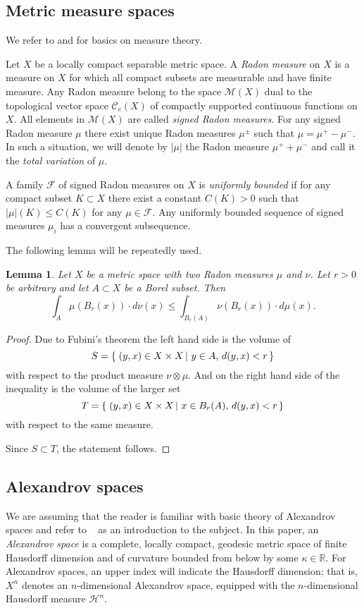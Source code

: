 \documentclass[12pt,leqno,intlimits]{amsart}
\numberwithin{equation}{section}
\newtheorem{lem}[thm]{Lemma}
\theoremstyle{definition}
\theoremstyle{remark}
\newcommand{\R}{\mathbb{R}}
\newcommand*{\set}[2]{\left\{\,\left.{#1}\vphantom{#2}\,\right|\,{#2}\,\right\}}
\begin{document}
\subsection{Metric measure spaces} We refer to \cite{Federer} and \cite{Evans} for basics on measure theory.

Let $X$ be a locally compact separable metric space.
A \emph{Radon measure} on $X$ is a measure on $X$ for which all compact subsets are measurable and have finite measure.
Any Radon measure belong to the space $\mathcal M(X)$ dual to the topological vector space $\mathcal C_c (X)$ of compactly supported continuous functions on $X$.
All elements in $\mathcal M(X)$ are called \emph{signed Radon measures}.
For any signed Radon measure $\mu$ there exist unique Radon measures $\mu^{\pm}$ such that $\mu =\mu ^+- \mu ^-$.
In such a situation, we will denote by $|\mu |$ the Radon measure $\mu ^+ +\mu ^-$ and call it the \emph{total variation} of $\mu$.


A family $\mathcal F$ of signed Radon measures on $X$ is \emph{uniformly bounded} if for any compact subset $K\subset X$ there exist a constant $C(K)>0$ such that $|\mu| (K) \leq C(K)$ for any $\mu \in \mathcal F$.
Any uniformly bounded sequence of signed measures $\mu _i$ has a convergent subsequence.

The following lemma will be repeatedly used.

\begin{lem} \label{lem:exchange}
Let $X$ be a metric space with two Radon measures $\mu $ and $\nu$. Let $r>0$ be arbitrary and let $A\subset X$ be a Borel subset. Then
$$\int _A \mu (B_r(x)) \cdot d\nu (x) \leq \int _{B_r (A)} \nu (B_r (x)) \cdot d\mu (x).$$
\end{lem}

\begin{proof} Due to Fubini's theorem
the left hand side is the volume of 
$$S=\set{(y,x) \in X\times X}{y \in A,\, d(y,x) <r}$$
with respect to the product measure $\nu \otimes \mu$. %
And on the right hand side of the inequality is the volume of the larger set 
$$T=\set{(y,x) \in X\times X}{x\in B_r(A), \, d(y,x)<r}$$
with respect to the same measure.

Since $S\subset T$, the statement follows.
\end{proof}

\subsection{Alexandrov spaces} \label{subsec:Alex}
We are assuming that the reader is familiar with basic theory of Alexandrov spaces and refer to ~\cite{BGP} as an introduction to the subject.
In this paper, an \emph{Alexandrov space} is a complete, locally compact, geodesic metric space of finite Hausdorff dimension and of curvature bounded from below by some $\kappa \in \R$.
For Alexandrov spaces, an upper index will indicate the Hausdorff dimension; that is, $X^n$ denotes an $n$-dimensional Alexandrov space, equipped with the $n$-dimensional Hausdorff measure $\mathcal H^n$.
\end{document}
